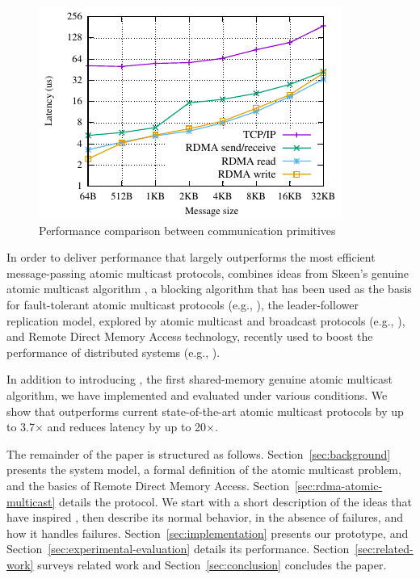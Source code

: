 \begin{figure}[htp!]
    \centering
    \includegraphics[width=0.99\columnwidth]{figures/benchmark/graphs/figure-protocol-bench.pdf}
  \caption{Performance comparison between communication primitives}
  \label{fig:perfcomp}
\end{figure}

In order to deliver performance that largely outperforms the most efficient message-passing atomic multicast protocols, \libname combines ideas from Skeen's genuine atomic multicast algorithm \cite{BJ87b}, a blocking algorithm that has been used as the basis for fault-tolerant atomic multicast protocols (e.g., \cite{Coelho2017,gotsman2019white}), the leader-follower replication model, explored by atomic multicast and broadcast protocols (e.g., \cite{gotsman2019white,Junqueira2011,Mu}), and Remote Direct Memory Access technology, recently used to boost the performance of distributed systems (e.g., \cite{Aguilera2019,kalia2014using, kalia2016design, mitchell2013using}).

In addition to introducing \libname, the first shared-memory genuine atomic multicast algorithm, we have implemented and evaluated \libname under various conditions. 
We show that \libname outperforms current state-of-the-art atomic multicast protocols by up to 3.7$\times$ and reduces latency by up to 20$\times$.

The remainder of the paper is structured as follows.
Section~\ref{sec:background} presents the system model, a formal definition of the atomic multicast problem, and the basics of Remote Direct Memory Access.
Section~\ref{sec:rdma-atomic-multicast} details the \libname protocol.
We start with a short description of the ideas that have inspired \libname, then describe its normal behavior, in the absence of failures, and how it handles failures.
Section~\ref{sec:implementation} presents our prototype, and Section~\ref{sec:experimental-evaluation} details its performance.
Section~\ref{sec:related-work} surveys related work and Section~\ref{sec:conclusion} concludes the paper.

